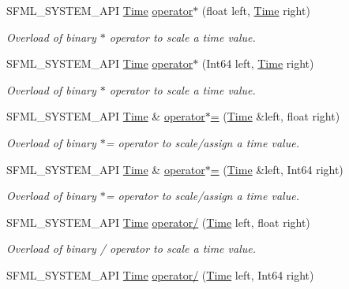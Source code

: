 \begin{DoxyCompactItemize}
S\+F\+M\+L\+\_\+\+S\+Y\+S\+T\+E\+M\+\_\+\+A\+PI \hyperlink{classsf_1_1Time}{Time} \hyperlink{classsf_1_1Time_a63723c9e9c5ff6151377ec4350c6f36e}{operator$\ast$} (float left, \hyperlink{classsf_1_1Time}{Time} right)
\begin{DoxyCompactList}\small\item\em Overload of binary $\ast$ operator to scale a time value. \end{DoxyCompactList}\item 
S\+F\+M\+L\+\_\+\+S\+Y\+S\+T\+E\+M\+\_\+\+A\+PI \hyperlink{classsf_1_1Time}{Time} \hyperlink{classsf_1_1Time_a40a6d0938fb4a43731d54fd90bfc6476}{operator$\ast$} (Int64 left, \hyperlink{classsf_1_1Time}{Time} right)
\begin{DoxyCompactList}\small\item\em Overload of binary $\ast$ operator to scale a time value. \end{DoxyCompactList}\item 
S\+F\+M\+L\+\_\+\+S\+Y\+S\+T\+E\+M\+\_\+\+A\+PI \hyperlink{classsf_1_1Time}{Time} \& \hyperlink{classsf_1_1Time_a8996b6a6fcb8f3854b486b8e43949b50}{operator$\ast$=} (\hyperlink{classsf_1_1Time}{Time} \&left, float right)
\begin{DoxyCompactList}\small\item\em Overload of binary $\ast$= operator to scale/assign a time value. \end{DoxyCompactList}\item 
S\+F\+M\+L\+\_\+\+S\+Y\+S\+T\+E\+M\+\_\+\+A\+PI \hyperlink{classsf_1_1Time}{Time} \& \hyperlink{classsf_1_1Time_a6656a0a1a1802009a72d93fbba61f24a}{operator$\ast$=} (\hyperlink{classsf_1_1Time}{Time} \&left, Int64 right)
\begin{DoxyCompactList}\small\item\em Overload of binary $\ast$= operator to scale/assign a time value. \end{DoxyCompactList}\item 
S\+F\+M\+L\+\_\+\+S\+Y\+S\+T\+E\+M\+\_\+\+A\+PI \hyperlink{classsf_1_1Time}{Time} \hyperlink{classsf_1_1Time_a3386c392dbc62e51dfa59730854d1ed2}{operator/} (\hyperlink{classsf_1_1Time}{Time} left, float right)
\begin{DoxyCompactList}\small\item\em Overload of binary / operator to scale a time value. \end{DoxyCompactList}\item 
S\+F\+M\+L\+\_\+\+S\+Y\+S\+T\+E\+M\+\_\+\+A\+PI \hyperlink{classsf_1_1Time}{Time} \hyperlink{classsf_1_1Time_ab72f2de3e2bb592b4b4008dc1ac79056}{operator/} (\hyperlink{classsf_1_1Time}{Time} left, Int64 right)

\end{DoxyCompactItemize}
